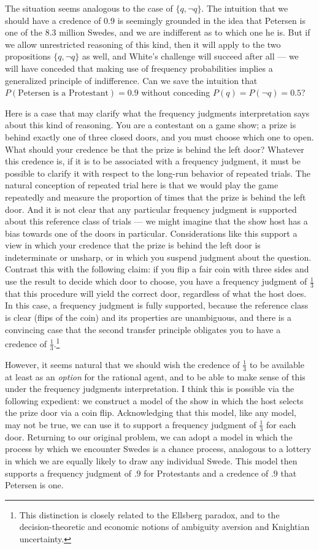 \documentclass[letterpaper,12pt]{article}
\begin{document}
The situation seems analogous to the case of $\{q, \neg q\}$. The intuition that we should have a credence of $0.9$ is seemingly grounded in the idea that Petersen is one of the 8.3 million Swedes, and we are indifferent as to which one he is. But if we allow unrestricted reasoning of this kind, then it will apply to the two propositions $\{q, \neg q\}$ as well, and White's challenge will succeed after all --- we will have conceded that making use of frequency probabilities implies a generalized principle of indifference. Can we save the intuition that $P(\textrm{Petersen is a Protestant}) = 0.9$ without conceding $P(q) = P(\neg q) = 0.5$?

Here is a case that may clarify what the frequency judgments interpretation says about this kind of reasoning. You are a contestant on a game show; a prize is behind exactly one of three closed doors, and you must choose which one to open. What should your credence be that the prize is behind the left door? Whatever this credence is, if it is to be associated with a frequency judgment, it must be possible to clarify it with respect to the long-run behavior of repeated trials. The natural conception of repeated trial here is that we would play the game repeatedly and measure the proportion of times that the prize is behind the left door. And it is not clear that any particular frequency judgment is supported about this reference class of trials --- we might imagine that the show host has a bias towards one of the doors in particular. Considerations like this support a view in which your credence that the prize is behind the left door is indeterminate or unsharp, or in which you suspend judgment about the question. Contrast this with the following claim: if you flip a fair coin with three sides and use the result to decide which door to choose, you have a frequency judgment of $\frac{1}{3}$ that this procedure will yield the correct door, regardless of what the host does. In this case, a frequency judgment is fully supported, because the reference class is clear (flips of the coin) and its properties are unambiguous, and there is a convincing case that the second transfer principle obligates you to have a credence of $\frac{1}{3}$.\footnote{This distinction is closely related to the Ellsberg paradox, and to the decision-theoretic and economic notions of ambiguity aversion and Knightian uncertainty.}

However, it seems natural that we should wish the credence of $\frac{1}{3}$ to be available at least as an \emph{option} for the rational agent, and to be able to make sense of this under the frequency judgments interpretation. I think this is possible via the following expedient: we construct a model of the show in which the host selects the prize door via a coin flip. Acknowledging that this model, like any model, may not be true, we can use it to support a frequency judgment of $\frac{1}{3}$ for each door. Returning to our original problem, we can adopt a model in which the process by which we encounter Swedes is a chance process, analogous to a lottery in which we are equally likely to draw any individual Swede. This model then supports a frequency judgment of $.9$ for Protestants and a credence of $.9$ that Petersen is one.
\end{document}
